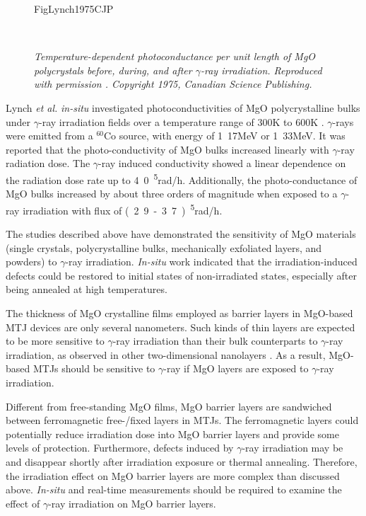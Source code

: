 \documentclass[molecules,review,submit,pdftex,moreauthors]{Definitions/mdpi}
\begin{document}
\begin{figure}
  \begin{center}
    	\begin{overpic}[width=0.66\linewidth]{FigLynch1975CJP}
	    \end{overpic} \\
  \end{center}
  \vspace{-12pt}
  \caption{\textit{Temperature-dependent photoconductance per unit length of MgO polycrystals before, during, and after $\gamma$-ray
irradiation.  Reproduced with permission \cite{Lynch1975CJP}.  Copyright 1975, Canadian Science Publishing.}}
  \label{Fig:Lynch1975CJP}
\end{figure}


Lynch \textit{et al.} \textit{in-situ} investigated photoconductivities of MgO polycrystalline bulks under $\gamma$-ray irradiation fields over a temperature range of \unit{300}{K} to \unit{600}{K}  \cite{Lynch1975CJP}.  $\gamma$-rays were emitted from a $^{60}$Co source, with energy of \unit{1.17}{MeV} or \unit{1.33}{MeV}.  It was reported that the photo-conductivity of MgO bulks increased linearly with $\gamma$-ray radiation dose.  The $\gamma$-ray induced conductivity showed a linear dependence on the radiation dose rate up to \unit{4.0 ^5}{rad/h}.  Additionally, the photo-conductance of MgO bulks increased by about three orders of magnitude when exposed to a $\gamma$-ray irradiation with flux of \unit{(2.9 - 3.7) ^5}{rad/h}.


The studies described above have demonstrated the sensitivity of MgO materials (single crystals, polycrystalline bulks, mechanically exfoliated layers, and powders) to $\gamma$-ray irradiation.  \textit{In-situ} work indicated that the irradiation-induced defects could be restored to initial states of non-irradiated states, especially after being annealed at high temperatures.


The thickness of MgO crystalline films employed as barrier layers in MgO-based MTJ devices are only several nanometers. Such kinds of thin layers are expected to be more sensitive to $\gamma$-ray irradiation than their bulk counterparts to $\gamma$-ray irradiation, as observed in other two-dimensional nanolayers \cite{Zhao2019AS}.  As a result, MgO-based MTJs should be sensitive to $\gamma$-ray if MgO layers are exposed to $\gamma$-ray irradiation.  


Different from free-standing MgO films, MgO barrier layers are sandwiched between ferromagnetic free-/fixed layers in MTJs.  The ferromagnetic layers could potentially reduce irradiation dose into MgO barrier layers and provide some levels of protection. Furthermore, defects induced by $\gamma$-ray irradiation may be  and disappear shortly after irradiation exposure or thermal annealing.  Therefore, the irradiation effect on MgO barrier layers are more complex than discussed above.  \textit{In-situ} and real-time measurements should be required to examine the effect of $\gamma$-ray irradiation on MgO barrier layers.  
\end{document}
